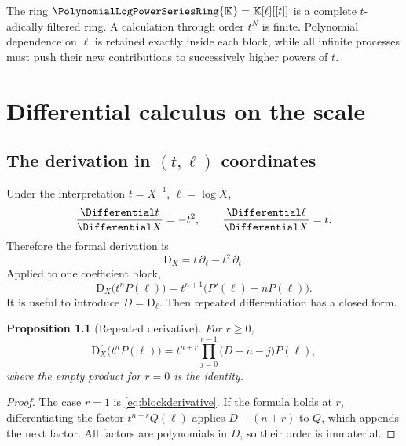 \documentclass[11pt,oneside,openany]{book}
\newtheorem{proposition}[theorem]{Proposition}
\newcommand{\K}{\mathbb{K}}
\newcommand{\Rring}{\PolynomialLogPowerSeriesRing{\K}}
\newcommand{\D}{\mathrm{D}}
\begin{document}
\begin{summarybox}
The ring \(\Rring=\K[\ell][[t]]\) is a complete \(t\)-adically filtered ring.
A calculation through order \(t^N\) is finite.  Polynomial dependence on
\(\ell\) is retained exactly inside each block, while all infinite processes
must push their new contributions to successively higher powers of \(t\).
\end{summarybox}

\chapter{Differential calculus on the scale}
\label{ch:differential}

\section{The derivation in \texorpdfstring{\((t,\ell)\)}{(t,l)} coordinates}
Under the interpretation \(t=X^{-1}\), \(\ell=\log X\),
\[
  \frac{\Differential t}{\Differential X}=-t^2,
  \qquad
  \frac{\Differential\ell}{\Differential X}=t.
\]
Therefore the formal derivation is
\begin{equation}\label{eq:DXoperator}
  \D_X=t\,\partial_\ell-t^2\,\partial_t.
\end{equation}
Applied to one coefficient block,
\begin{equation}\label{eq:blockderivative}
  \D_X\bigl(t^nP(\ell)\bigr)
  =t^{n+1}\bigl(P'(\ell)-nP(\ell)\bigr).
\end{equation}
It is useful to introduce \(D=\D_\ell\).  Then repeated differentiation has a
closed form.

\begin{proposition}[Repeated derivative]\label{prop:repeatedD}
For \(r\geq0\),
\begin{equation}\label{eq:repeatedD}
  \D_X^r\bigl(t^nP(\ell)\bigr)
  =t^{n+r}
    \prod_{j=0}^{r-1}\bigl(D-n-j\bigr)P(\ell),
\end{equation}
where the empty product for \(r=0\) is the identity.
\end{proposition}

\begin{proof}
The case \(r=1\) is \cref{eq:blockderivative}.  If the formula holds at
\(r\), differentiating the factor
\(t^{n+r}Q(\ell)\) applies \(D-(n+r)\) to \(Q\), which appends the next factor.
All factors are polynomials in \(D\), so their order is immaterial.
\end{proof}
\end{document}
